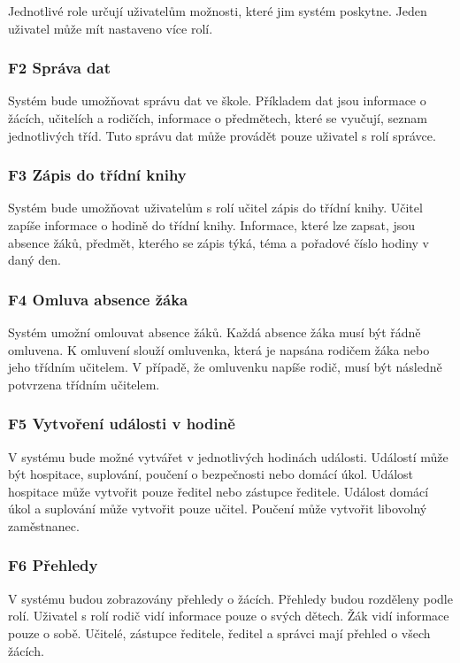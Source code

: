Jednotlivé role určují uživatelům možnosti, které jim systém poskytne. Jeden uživatel může mít nastaveno více rolí.

\subsubsection*{F2 Správa dat}
Systém bude umožňovat správu dat ve škole. Příkladem dat jsou informace o žácích, učitelích a rodičích, informace o předmětech, které se vyučují, seznam jednotlivých tříd. Tuto správu dat může provádět pouze uživatel s rolí správce.

\subsubsection*{F3 Zápis do třídní knihy}
Systém bude umožňovat uživatelům s rolí učitel zápis do třídní knihy. Učitel zapíše informace o hodině do třídní knihy. Informace, které lze zapsat, jsou absence žáků, předmět, kterého se zápis týká, téma a pořadové číslo hodiny v daný den.

\subsubsection*{F4 Omluva absence žáka}
Systém umožní omlouvat absence žáků. Každá absence žáka musí být řádně omluvena. K omluvení slouží omluvenka, která je napsána rodičem žáka nebo jeho třídním učitelem. V případě, že omluvenku napíše rodič, musí být následně potvrzena třídním učitelem.

\subsubsection*{F5 Vytvoření události v hodině}
V systému bude možné vytvářet v jednotlivých hodinách události. Událostí může být hospitace, suplování, poučení o bezpečnosti nebo domácí úkol. Událost hospitace může vytvořit pouze ředitel nebo zástupce ředitele. Událost domácí úkol a suplování může vytvořit pouze učitel. Poučení může vytvořit libovolný zaměstnanec.

\subsubsection*{F6 Přehledy}
V systému budou zobrazovány přehledy o žácích. Přehledy budou rozděleny podle rolí. 
Uživatel s rolí rodič vidí informace pouze o svých dětech. Žák vidí informace pouze o sobě. Učitelé, zástupce ředitele, ředitel a správci mají přehled o všech žácích.


